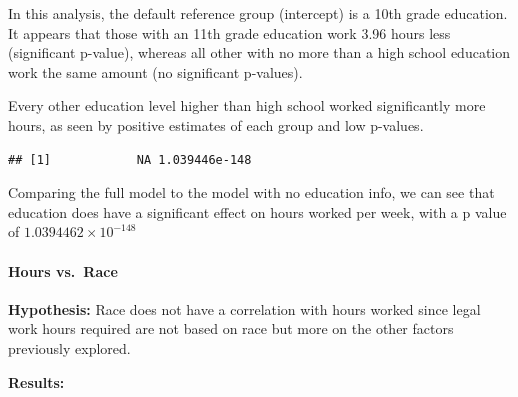 \documentclass[]{article}
\newenvironment{Shaded}{\begin{snugshade}}{\end{snugshade}}
\newcommand{\KeywordTok}[1]{\textcolor[rgb]{0.13,0.29,0.53}{\textbf{#1}}}
\newcommand{\NormalTok}[1]{#1}
\newcommand{\OperatorTok}[1]{\textcolor[rgb]{0.81,0.36,0.00}{\textbf{#1}}}
\let\oldparagraph\paragraph
\renewcommand{\paragraph}[1]{\oldparagraph{#1}\mbox{}}
\begin{document}
In this analysis, the default reference group (intercept) is a 10th
grade education. It appears that those with an 11th grade education work
3.96 hours less (significant p-value), whereas all other with no more
than a high school education work the same amount (no significant
p-values).

Every other education level higher than high school worked significantly
more hours, as seen by positive estimates of each group and low
p-values.

\begin{Shaded}
\end{Shaded}

\begin{verbatim}
## [1]            NA 1.039446e-148
\end{verbatim}

Comparing the full model to the model with no education info, we can see
that education does have a significant effect on hours worked per week,
with a p value of \ensuremath{1.0394462\times 10^{-148}}

\hypertarget{hours-vs.race}{%
\paragraph{Hours vs.~Race}\label{hours-vs.race}}

\textbf{Hypothesis:} Race does not have a correlation with hours worked
since legal work hours required are not based on race but more on the
other factors previously explored.

\textbf{Results:}
\end{document}
